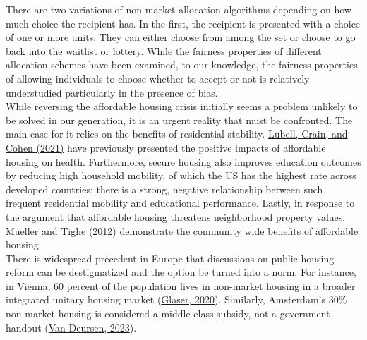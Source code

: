 \documentclass[11pt]{article}
\begin{document}
 \newline
There are two variations of non-market allocation algorithms depending on how much choice the recipient has. In the first, the recipient is presented with a choice of one or more units. They can either choose from among the set or choose to go back into the waitlist or lottery. While the fairness properties of different allocation schemes have been examined, to our knowledge, the fairness properties of allowing individuals to choose whether to accept or not is relatively understudied particularly in the presence of bias.\\
 \newline
While reversing the affordable housing crisis initially seems a problem unlikely to be solved in our generation, it is an urgent reality that must be confronted. The main case for it relies on the benefits of residential stability. \href{https://nhc.org/wp-content/uploads/2017/03/The-Impacts-of-Affordable-Housing-on-Health-A-Research-Summary.pdf}{Lubell, Crain, and Cohen (2021)} have previously presented the positive impacts of affordable housing on health. Furthermore, secure housing also improves education outcomes by reducing high household mobility, of which the US has the highest rate across developed countries; there is a strong, negative relationship between such frequent residential mobility and educational performance. Lastly, in response to the argument that affordable housing threatens neighborhood property values,  \href{https://www.researchgate.net/publication/235355600_Affordable_Housing_Reader}{ Mueller and Tighe (2012)} demonstrate the community wide benefits of affordable housing.\\
\newline
There is widespread precedent in Europe that discussions on public housing reform can be destigmatized and the option be turned into a norm. For instance, in Vienna, 60 percent of the population lives in non-market housing in a broader integrated unitary housing market (\href{https://www.researchgate.net/publication/341951502_How_Much_State_and_How_Much_Market_Comparing_Social_Housing_in_Berlin_and_Vienna}{Glaser, 2020}). Similarly, Amsterdam's 30\% non-market housing is considered a middle class subsidy, not a government handout (\href{https://www.jchs.harvard.edu/blog/peoples-housing-non-profit-social-housing-netherlands}{Van Deursen, 2023}).\\
\newline
\end{document}
